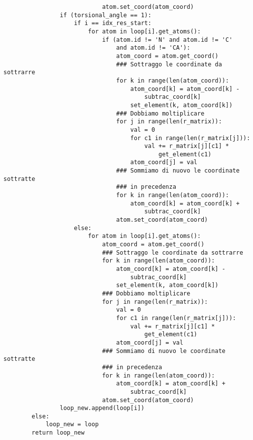 \begin{verbatim}
                            atom.set_coord(atom_coord)
                if (torsional_angle == 1):
                    if i == idx_res_start:
                        for atom in loop[i].get_atoms():
                            if (atom.id != 'N' and atom.id != 'C' 
                                and atom.id != 'CA'):
                                atom_coord = atom.get_coord()
                                ### Sottraggo le coordinate da sottrarre
                                for k in range(len(atom_coord)):
                                    atom_coord[k] = atom_coord[k] - 
                                        subtrac_coord[k]
                                    set_element(k, atom_coord[k])
                                ### Dobbiamo moltiplicare
                                for j in range(len(r_matrix)):
                                    val = 0
                                    for c1 in range(len(r_matrix[j])):
                                        val += r_matrix[j][c1] * 
                                            get_element(c1)
                                    atom_coord[j] = val
                                ### Sommiamo di nuovo le coordinate sottratte 
                                ### in precedenza
                                for k in range(len(atom_coord)):
                                    atom_coord[k] = atom_coord[k] + 
                                        subtrac_coord[k]
                                atom.set_coord(atom_coord)
                    else:
                        for atom in loop[i].get_atoms():
                            atom_coord = atom.get_coord()
                            ### Sottraggo le coordinate da sottrarre
                            for k in range(len(atom_coord)):
                                atom_coord[k] = atom_coord[k] - 
                                    subtrac_coord[k]
                                set_element(k, atom_coord[k])
                            ### Dobbiamo moltiplicare
                            for j in range(len(r_matrix)):
                                val = 0
                                for c1 in range(len(r_matrix[j])):
                                    val += r_matrix[j][c1] * 
                                        get_element(c1)
                                atom_coord[j] = val
                            ### Sommiamo di nuovo le coordinate sottratte 
                            ### in precedenza
                            for k in range(len(atom_coord)):
                                atom_coord[k] = atom_coord[k] + 
                                    subtrac_coord[k]
                            atom.set_coord(atom_coord)
                loop_new.append(loop[i])
        else: 
            loop_new = loop
        return loop_new
\end{verbatim}

